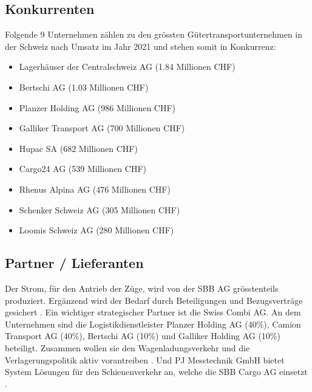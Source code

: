\documentclass{article}
\begin{document}
\subsection{Konkurrenten}
Folgende 9 Unternehmen zählen zu den grössten Gütertransportunternehmen in der Schweiz nach Umsatz im Jahr 2021 und stehen somit in Konkurrenz:
\begin{itemize}
\item Lagerhäuser der Centralschweiz AG (1.84 Millionen CHF)
\item Bertschi AG (1.03 Millionen CHF)
\item Planzer Holding AG (986 Millionen CHF)
\item Galliker Transport AG (700 Millionen CHF)
\item Hupac SA (682 Millionen CHF)
\item Cargo24 AG (539 Millionen CHF)
\item Rhenus Alpina AG (476 Millionen CHF)
\item Schenker Schweiz AG (305 Millionen CHF)
\item Loomis Schweiz AG (280 Millionen CHF)
\end{itemize}
\parencite[o. S.]{groessteUnternehmenGuetertransport}

\subsection{Partner / Lieferanten}
Der Strom, für den Antrieb der Züge, wird von der SBB AG grösstenteils produziert.
Ergänzend wird der Bedarf durch Beteiligungen und Bezugsverträge gesichert \parencite[o. S.]{verbrauch}.
Ein wichtiger strategischer Partner ist die Swiss Combi AG. 
An dem Unternehmen sind die Logistikdienstleister Planzer Holding AG (40\%), Camion Transport AG (40\%), Bertschi AG (10\%) und Galliker Holding AG (10\%) beteiligt.
Zusammen wollen sie den Wagenladungsverkehr und die Verlagerungspolitik aktiv vorantreiben \parencite[o. S.]{sbbGueterZukunft}.
Und PJ Messtechnik GmbH bietet System Lösungen für den Schienenverkehr an, welche die SBB Cargo AG einsetzt \parencite[o. S.]{partnerPJMesstechnik}.
\end{document}

